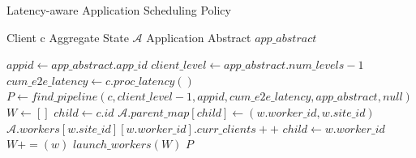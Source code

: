 \begin{algorithm}
\caption{Latency-aware Application Scheduling Policy}
\label{algo:oneedge_scheduling_policy}
\begin{algorithmic}[1]
\Require Client c
\Require Aggregate State $\mathcal{A}$
\Require Application Abstract $app\_abstract$

\State $appid \gets app\_abstract.app\_id$
\State $client\_level \gets app\_abstract.num\_levels-1$
\State $cum\_e2e\_latency \gets c.proc\_latency()$ 
\State $P \gets find\_pipeline \left( c, client\_level - 1, appid, cum\_e2e\_latency, app\_abstract, null \right)$
\State $W \gets []$ 
\State $child \gets c.id$
 
    \State $\mathcal{A}.parent\_map[child] \gets \left( w.worker\_id, w.site\_id \right)$
    \State $\mathcal{A}.workers[w.site\_id][w.worker\_id].curr\_clients ++$
    \State $child \gets w.worker\_id$
        \State $W += \left( w \right)$  
    \EndIf
\EndFor
\State $launch\_workers \left( W \right)$
\State \Return $P$
\end{algorithmic}
\end{algorithm}

